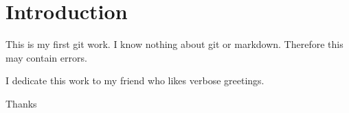 
\section{Introduction}

This is my first git work. I know nothing about git or markdown. Therefore this may contain errors.

I dedicate this work to my friend who likes verbose greetings.

Thanks


